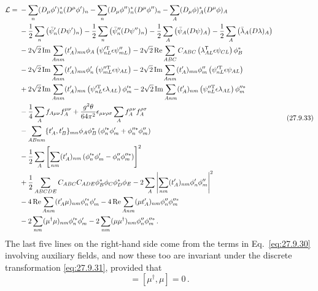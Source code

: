 \begin{equation}
  \begin{aligned}
  \mathcal{L}={}&
  -\sum_n(D_\mu\phi')_n^*(D^\mu\phi')_n
  -\sum_n(D_\mu\phi'')_n^*(D^\mu\phi'')_n
  -\sum_A(D_\mu\phi)_A^*(D^\mu\phi)_A
  \\
  &-\frac12\sum_n\left(\bar\psi'_n(\sl{D}\psi')_n\right)
  -\frac12\sum_n\left(\bar\psi''_n(\sl{D}\psi'')_n\right)
  -\frac12\sum_A\left(\bar\psi_A(\sl{D}\psi)_A\right)
  -\frac12\sum_A\left(\bar\lambda_A(\sl{D}\lambda)_A\right)
  \\
  &-2\sqrt{2}\operatorname{Im}\sum_{Anm}(t'_A)_{mn}\phi_A
    \left(\psi_{nL}^{\prime\mathrm T}\epsilon\psi''_{mL}\right)
  -2\sqrt{2}\operatorname{Re}\sum_{ABC}C_{ABC}
    \left(\lambda_{AL}^{\mathsf T}\epsilon\psi_{CL}\right)\phi_B^*
  \\
  &-2\sqrt{2}\operatorname{Im}\sum_{Anm}(t'_A)_{mn}\phi'_n
    \left(\psi_{mL}^{\prime\prime\mathrm T}\epsilon\psi_{AL}\right)
  -2\sqrt{2}\operatorname{Im}\sum_{Anm}(t'_A)_{mn}\phi''_m
    \left(\psi_{nL}^{\prime\mathrm T}\epsilon\psi_{AL}\right)
  \\
  &+2\sqrt{2}\operatorname{Im}\sum_{Anm}(t'_A)_{mn}
    \left(\psi_{nL}^{\prime\mathrm T}\epsilon\lambda_{AL}\right)\phi_m^{\prime *}
  -2\sqrt{2}\operatorname{Im}\sum_{Anm}(t'_A)_{nm}
    \left(\psi_{nL}^{\prime\prime\mathrm T}\epsilon\lambda_{AL}\right)
    \phi_m^{\prime\prime *}
  \\
  &-\frac14\sum_Af_{A\mu\nu}f_A^{\mu\nu}
  +\frac{g^2\theta}{64\pi^2}\epsilon_{\mu\nu\rho\sigma}
    \sum_Af_A^{\mu\nu}f_A^{\rho\sigma}
  \\
  &-\sum_{ABnm}\{t'_A,t'_B\}_{mn}\phi_A\phi_B^*
    \left(\phi_n^{\prime *}\phi'_m+\phi_n^{\prime\prime *}\phi''_m\right)
  \\
  &-\frac12\sum_A\left[
    \sum_{nm}(t'_A)_{nm}
    \left(\phi_n^{\prime *}\phi'_m-\phi''_n\phi_m^{\prime\prime *}\right)
  \right]^2
  \\
  &+\frac12\sum_{ABCDE}C_{ABC}C_{ADE}
    \phi_B^*\phi_C\phi_D^*\phi_E
  -2\sum_A\left|\sum_{nm}(t'_A)_{nm}\phi'_n\phi''_m\right|^2
  \\
  &-4\operatorname{Re}\sum_{Anm}(t'_A\mu)_{nm}\phi_n^{\prime *}\phi'_m
  -4\operatorname{Re}\sum_{Anm}(\mu t'_A)_{nm}
    \phi''_n\phi_m^{\prime\prime *}
  \\
  &-2\sum_{nm}(\mu^\dagger\mu)_{nm}\phi_n^{\prime *}\phi'_m
  -2\sum_{nm}(\mu\mu^\dagger)_{nm}\phi''_n\phi_m^{\prime\prime *}\,.
  \end{aligned}
  \tag{27.9.33}\label{eq:27.9.33}
\end{equation}
The last five lines on the right-hand side come from the terms in
Eq.~\eqref{eq:27.9.30} involving auxiliary fields, and now these too are
invariant under the discrete transformation \eqref{eq:27.9.31}, provided
that
\begin{equation}
  [t'_A,\mu]=[\mu^\dagger,\mu]=0\,.
  \tag{27.9.34}\label{eq:27.9.34}
\end{equation}

